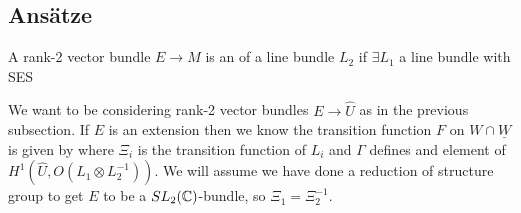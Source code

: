 \documentclass{article}
\begin{document}
\subsection{ Ans\"atze}

\begin{definition}
	A rank-2 vector bundle $E \to M$ is an  of a line bundle $L_2$ if $\exists L_1$ a line bundle with SES
\end{definition}

We want to be considering rank-2 vector bundles $E \to \hat{U}$ as in the previous subsection. If $E$ is an extension then we know the transition function $F$ on $W \cap \underline{W}$ is given by 
where $\Xi_i$ is the transition function of $L_i$ and $\Gamma$ defines and element of $H^1(\hat{U}, O(L_1 \otimes L_2^{-1}))$. We will assume we have done a reduction of structure group to get $E$ to be a $SL_2(\mathbb{C})$-bundle, so $\Xi_1 = \Xi_2^{-1}$.
\end{document}
